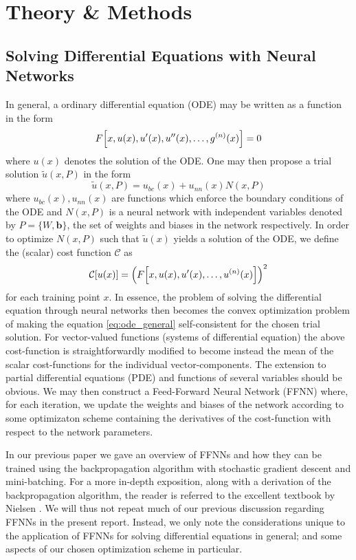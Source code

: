 \documentclass[reprint, english, nofootinbib]{revtex4-2}
\begin{document}
\section{Theory \& Methods}

\subsection{Solving Differential Equations with Neural Networks}
\noindent
In general, a ordinary differential equation (ODE) may be written as a function in the form
\begin{equation}
\label{eq:ode_general}
    F \qty[x, u(x), u'(x), u''(x), \dots, g^{(n)}(x)] = 0
\end{equation}    
where $u(x)$ denotes the solution of the ODE. One may then propose a trial solution $\tilde u(x,P)$ in the form
\begin{equation}
    \tilde u(x, P) = u_{bc}(x) + u_{nn}(x)N(x, P) 
\end{equation}
where $u_{bc}(x), u_{nn}(x)$ are functions which enforce the boundary conditions of the ODE and $N(x, P)$ is a neural network with independent variables denoted by $P = \{W, \pmb b\}$, the set of weights and biases in the network respectively. In order to optimize $N(x, P)$ such that $\tilde u(x)$ yields a solution of the ODE, we define the (scalar) cost function $\mathcal{C}$ as
\begin{equation}
    \mathcal C\qty[u\qty(x)] = \qty(F\qty[x, u(x), u'(x), \dots, u^{(n)}(x)])^2
\end{equation}
for each training point $x$. In essence, the problem of solving the differential equation through neural networks then becomes the convex optimization problem of making the equation \ref{eq:ode_general} self-consistent for the chosen trial solution. For vector-valued functions (systems of differential equation) the above cost-function is straightforwardly modified to become instead the mean of the scalar cost-functions for the individual vector-components. The extension to partial differential equations (PDE) and functions of several variables should be obvious. We may then construct a Feed-Forward Neural Network (FFNN) where, for each iteration, we update the weights and biases of the network according to some optimizaton scheme containing the derivatives of  the cost-function with respect to the network parameters. 

In our previous paper \citep{4155_project_2} we gave an overview of FFNNs and how they can be trained using the backpropagation algorithm with stochastic gradient descent and mini-batching. For a more in-depth exposition, along with a derivation of the backpropagation algorithm, the reader is referred to the excellent textbook by Nielsen \citep{Nielsen}. We will thus not repeat much of our previous discussion regarding FFNNs in the present report. Instead, we only note the considerations unique to the application of FFNNs for solving differential equations in general; and some aspects of our chosen optimization scheme in particular.
\end{document}
